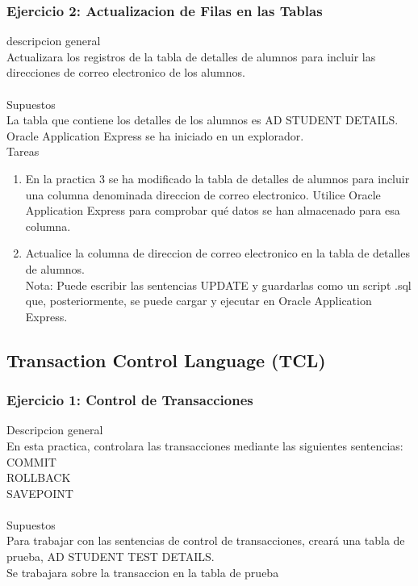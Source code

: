 \documentclass[12pt,letterpaper]{article}
\begin{document}
		\subsubsection{Ejercicio 2: Actualizacion de Filas en las Tablas} 
descripcion general  \\
Actualizara los registros de la tabla de detalles de alumnos para incluir las direcciones de correo electronico de los alumnos.\\
 \\
Supuestos\\
La tabla que contiene los detalles de los alumnos es AD STUDENT DETAILS.\\
Oracle Application Express se ha iniciado en un explorador.\\


Tareas\\
\begin{enumerate}[1.]
    \item En la practica 3 se ha modificado la tabla de detalles de alumnos para incluir una columna denominada direccion de correo electronico. Utilice Oracle Application Express para comprobar qué datos se han almacenado para esa columna.  
     \item Actualice la columna de direccion de correo electronico en la tabla de detalles de alumnos.\\
    Nota: Puede escribir las sentencias UPDATE y guardarlas como un script .sql que, posteriormente, se puede cargar y ejecutar en Oracle Application Express.\\
    
		\end{enumerate}





\newpage
\subsection{Transaction Control Language (TCL)} 


\subsubsection{Ejercicio 1: Control de Transacciones} 
Descripcion general  \\
En esta practica, controlara las transacciones mediante las siguientes sentencias: \\
COMMIT \\
ROLLBACK \\
SAVEPOINT \\
 \\
Supuestos\\
Para trabajar con las sentencias de control de transacciones, creará una tabla de prueba, AD STUDENT TEST DETAILS.\\
Se trabajara sobre la transaccion en la tabla de prueba\\
\end{document}
